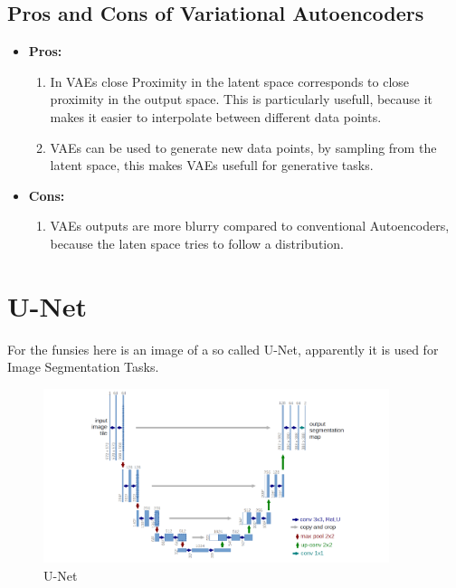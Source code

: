 \documentclass[a4paper]{article}
\begin{document}
 \subsection{Pros and Cons of Variational Autoencoders}
 \begin{itemize}
    \item \textbf{Pros:}
    \begin{enumerate}
        \item In VAEs close Proximity in the latent space corresponds to close proximity in the output space. This is particularly usefull, because it makes it easier to interpolate between different data points. 
        \item VAEs can be used to generate new data points, by sampling from the latent space, this makes VAEs usefull for generative tasks.    
    \end{enumerate}
    \item \textbf{Cons:}
    \begin{enumerate}
        \item VAEs outputs are more blurry compared to conventional Autoencoders, because the laten space tries to follow a distribution. 
        \end{enumerate}
 \end{itemize}
 \newpage
 \section{U-Net}
 For the funsies here is an image of a so called U-Net, apparently it is used for Image Segmentation Tasks. 
    \begin{figure}[h]
        \centering
        \includegraphics[width=0.9\textwidth]{images/unet.png}
        \caption{U-Net}
        \label{fig:U-Net}
    \end{figure}
\end{document}
